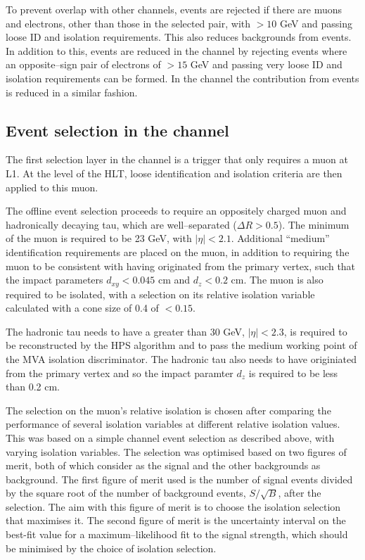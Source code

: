 To prevent overlap with other channels, events are rejected
if there are muons and electrons, other than those in the selected pair,
with \pT $>10$ GeV and passing loose ID and isolation requirements.
This also reduces backgrounds from \WZ events. 
In addition to this, \Zee events are 
reduced in the \etau channel by rejecting events
where an opposite--sign pair of electrons of \pT $>15$ GeV
and passing very loose ID and isolation requirements can be formed. 
In the \mutau channel the contribution from \Zmm events
is reduced in a similar fashion.


\subsection{\texorpdfstring{Event selection in the \mutau channel}{Event selection in the mu tau channel}}
\label{sec:mssm_eventsel_mt}
The first selection layer in the \mutau channel is a trigger
that only requires a muon at \ac{L1}. At the level of the \ac{HLT}, 
loose identification and isolation criteria are then applied to this muon.

The offline event selection proceeds to require an oppositely charged
muon and hadronically decaying tau, which are well--separated ($\Delta R > 0.5$).
The minimum \pT of the muon is required to be 23 GeV, with $|\eta| < 2.1$. %
Additional ``medium'' identification requirements are placed on the muon, in addition
to requiring the muon to be consistent with having originated from the primary vertex, such that
the impact parameters $d_{xy} < 0.045$ cm and $d_{z} < 0.2$ cm. The muon is also required
to be isolated, with a selection on its relative isolation variable calculated with a cone size of 0.4 of $< 0.15$.

The hadronic tau needs to have a \pT greater than 30 GeV, $|\eta|<2.3$,
is required to be reconstructed by the HPS algorithm and to pass the medium
working point of the MVA isolation discriminator. The hadronic tau also needs
to have originiated from the primary vertex and so the impact paramter $d_{z}$ is 
required to be less than 0.2 cm.

The selection on the muon's relative isolation is chosen after comparing
the performance of several isolation variables at different
relative isolation values. This was based on a simple \mutau channel
event selection as described above, with varying isolation variables.
The selection was optimised based on two figures of merit, both of
which consider \Ztautau as the signal and the other backgrounds
as background. The first figure of merit used is the number of signal events divided by the
square root of the number of background events, $S/\sqrt{B}$, after
the selection. The aim with this figure of merit is to choose
the isolation selection that maximises it. The second figure of merit
is the uncertainty interval on the best-fit value for a maximum--likelihood fit
to the \Ztautau signal strength, which should be minimised by the choice of
isolation selection.

